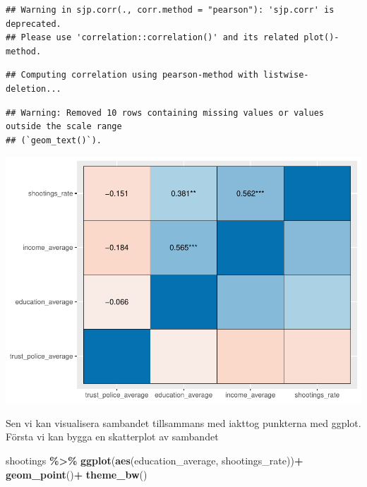 \documentclass[
]{book}
\newenvironment{Shaded}{\begin{snugshade}}{\end{snugshade}}
\newcommand{\FunctionTok}[1]{\textcolor[rgb]{0.13,0.29,0.53}{\textbf{#1}}}
\newcommand{\NormalTok}[1]{#1}
\newcommand{\SpecialCharTok}[1]{\textcolor[rgb]{0.81,0.36,0.00}{\textbf{#1}}}
\begin{document}
\begin{verbatim}
## Warning in sjp.corr(., corr.method = "pearson"): 'sjp.corr' is deprecated.
## Please use 'correlation::correlation()' and its related plot()-method.
\end{verbatim}

\begin{verbatim}
## Computing correlation using pearson-method with listwise-deletion...
\end{verbatim}

\begin{verbatim}
## Warning: Removed 10 rows containing missing values or values outside the scale range
## (`geom_text()`).
\end{verbatim}

\includegraphics{_main_files/figure-latex/unnamed-chunk-24-1.pdf}

Sen vi kan visualisera sambandet tillsammans med iakttog punkterna med ggplot. Första vi kan bygga en skatterplot av sambandet

\begin{Shaded}
\begin{Highlighting}[]
\NormalTok{shootings }\SpecialCharTok{\%\textgreater{}\%} 
  \FunctionTok{ggplot}\NormalTok{(}\FunctionTok{aes}\NormalTok{(education\_average, shootings\_rate))}\SpecialCharTok{+}
  \FunctionTok{geom\_point}\NormalTok{()}\SpecialCharTok{+}
  \FunctionTok{theme\_bw}\NormalTok{()}
\end{Highlighting}
\end{Shaded}
\end{document}
